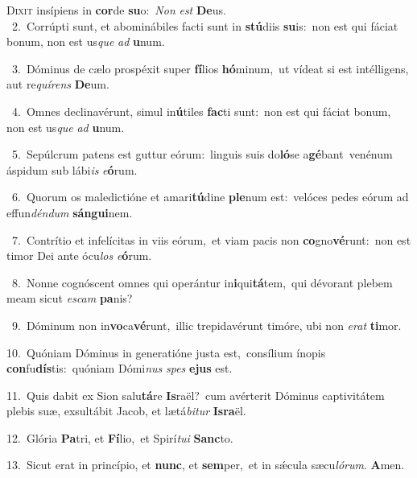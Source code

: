 \lettrine{\initial\textcolor{\initialcolor}{D}}{ixit} insípiens in \textbf{cor}\-de \textbf{su}\-o:~\star \textit{Non} \textit{est} \textbf{De}\-us.\\
{\numbfont\textcolor{\numbcolor}{~2.}}~Corrúpti sunt, et abominábiles facti sunt in \textbf{stú}\-diis \textbf{su}\-is:~\star non est qui fáciat bonum, non est us\textit{que} \textit{ad} \textbf{u}\-num.\par
{\numbfont\textcolor{\numbcolor}{~3.}}~Dóminus de cælo prospéxit super \textbf{fí}\-lios \textbf{hó}\-minum,~\star ut vídeat si est intélligens, aut re\-\textit{quí}\-\textit{rens} \textbf{De}\-um.\par
{\numbfont\textcolor{\numbcolor}{~4.}}~Omnes declinavérunt, simul in\-\textbf{ú}\-tiles \textbf{fac}\-ti sunt:~\star non est qui fáciat bonum, non est us\textit{que} \textit{ad} \textbf{u}\-num.\par
{\numbfont\textcolor{\numbcolor}{~5.}}~Sepúlcrum patens est guttur eórum:~\dagger linguis suis do\-\textbf{ló}\-se a\-\textbf{gé}\-bant~\star venénum áspidum sub lábi\textit{is} \textit{e}\-\textbf{ó}rum.\par
{\numbfont\textcolor{\numbcolor}{~6.}}~Quorum os maledictióne et amari\-\textbf{tú}\-dine \textbf{ple}\-num est:~\star velóces pedes eórum ad effun\-\textit{dén}\-\textit{dum} \textbf{sán}\-\textbf{gui}nem.\par
{\numbfont\textcolor{\numbcolor}{~7.}}~Contrítio et infelícitas in viis eórum,~\dagger et viam pacis non \textbf{co}\-gno\-\textbf{vé}\-runt:~\star non est timor Dei ante ócu\textit{los} \textit{e}\-\textbf{ó}rum.\par
{\numbfont\textcolor{\numbcolor}{~8.}}~Nonne cognóscent omnes qui operántur in\-\textbf{i}\-qui\-\textbf{tá}\-tem,~\star qui dévorant plebem meam sicut \textit{es}\-\textit{cam} \textbf{pa}\-nis?\par
{\numbfont\textcolor{\numbcolor}{~9.}}~Dóminum non in\-\textbf{vo}\-ca\-\textbf{vé}\-runt,~\star illic trepidavérunt timóre, ubi non \textit{e}\-\textit{rat} \textbf{ti}\-mor.\par
{\numbfont\textcolor{\numbcolor}{10.}}~Quóniam Dóminus in generatióne justa est,~\dagger consílium ínopis \textbf{con}\-fu\-\textbf{dís}\-tis:~\star quóniam Dómi\textit{nus} \textit{spes} \textbf{e}\-\textbf{jus} est.\par
{\numbfont\textcolor{\numbcolor}{11.}}~Quis dabit ex Sion salu\-\textbf{tá}\-re \textbf{Is}\-raël?~\star cum avérterit Dóminus captivitátem plebis suæ, exsultábit Jacob, et lætá\-\textit{bi}\-\textit{tur} \textbf{Is}\-\textbf{ra}ël.\par
{\numbfont\textcolor{\numbcolor}{12.}}~Glória \textbf{Pa}\-tri, et \textbf{Fí}\-lio,~\star et Spirí\-\textit{tu}\-\textit{i} \textbf{Sanc}\-to.\par
{\numbfont\textcolor{\numbcolor}{13.}}~Sicut erat in princípio, et \textbf{nunc}\-, et \textbf{sem}\-per,~\star et in sǽcula sæcu\-\textit{ló}\-\textit{rum}. \textbf{A}\-men.\par
